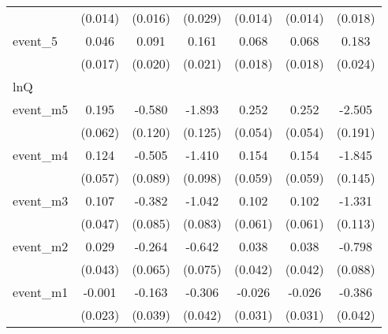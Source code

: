 {\begin{tabular}{l*{6}{c}}
            &     (0.014)         &     (0.016)         &     (0.029)         &     (0.014)         &     (0.014)         &     (0.018)         \\
[1em]
event\_5     &       0.046\sym{**} &       0.091\sym{***}&       0.161\sym{***}&       0.068\sym{***}&       0.068\sym{***}&       0.183\sym{***}\\
            &     (0.017)         &     (0.020)         &     (0.021)         &     (0.018)         &     (0.018)         &     (0.024)         \\
\hline
lnQ         &                     &                     &                     &                     &                     &                     \\
event\_m5    &       0.195\sym{**} &      -0.580\sym{***}&      -1.893\sym{***}&       0.252\sym{***}&       0.252\sym{***}&      -2.505\sym{***}\\
            &     (0.062)         &     (0.120)         &     (0.125)         &     (0.054)         &     (0.054)         &     (0.191)         \\
[1em]
event\_m4    &       0.124\sym{*}  &      -0.505\sym{***}&      -1.410\sym{***}&       0.154\sym{**} &       0.154\sym{**} &      -1.845\sym{***}\\
            &     (0.057)         &     (0.089)         &     (0.098)         &     (0.059)         &     (0.059)         &     (0.145)         \\
[1em]
event\_m3    &       0.107\sym{*}  &      -0.382\sym{***}&      -1.042\sym{***}&       0.102         &       0.102         &      -1.331\sym{***}\\
            &     (0.047)         &     (0.085)         &     (0.083)         &     (0.061)         &     (0.061)         &     (0.113)         \\
[1em]
event\_m2    &       0.029         &      -0.264\sym{***}&      -0.642\sym{***}&       0.038         &       0.038         &      -0.798\sym{***}\\
            &     (0.043)         &     (0.065)         &     (0.075)         &     (0.042)         &     (0.042)         &     (0.088)         \\
[1em]
event\_m1    &      -0.001         &      -0.163\sym{***}&      -0.306\sym{***}&      -0.026         &      -0.026         &      -0.386\sym{***}\\
            &     (0.023)         &     (0.039)         &     (0.042)         &     (0.031)         &     (0.031)         &     (0.042)         \\

\end{tabular}}
